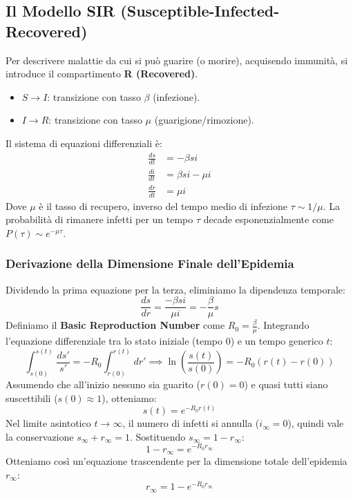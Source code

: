 \subsection{Il Modello SIR (Susceptible-Infected-Recovered)}
Per descrivere malattie da cui si può guarire (o morire), acquisendo immunità, si introduce il compartimento \textbf{R (Recovered)}.
\begin{itemize}
    \item $S \to I$: transizione con tasso $\beta$ (infezione).
    \item $I \to R$: transizione con tasso $\mu$ (guarigione/rimozione).
\end{itemize}
Il sistema di equazioni differenziali è:
\begin{align}
    \frac{ds}{dt} &= -\beta s i \\
    \frac{di}{dt} &= \beta s i - \mu i \\
    \frac{dr}{dt} &= \mu i
\end{align}
Dove $\mu$ è il tasso di recupero, inverso del tempo medio di infezione $\tau \sim 1/\mu$. La probabilità di rimanere infetti per un tempo $\tau$ decade esponenzialmente come $P(\tau) \sim e^{-\mu \tau}$.

\subsubsection{Derivazione della Dimensione Finale dell'Epidemia}
Dividendo la prima equazione per la terza, eliminiamo la dipendenza temporale:
\begin{equation}
    \frac{ds}{dr} = \frac{-\beta s i}{\mu i} = -\frac{\beta}{\mu} s
\end{equation}
Definiamo il \textbf{Basic Reproduction Number} come $R_0 = \frac{\beta}{\mu}$. Integrando l'equazione differenziale tra lo stato iniziale (tempo 0) e un tempo generico $t$:
\begin{equation}
    \int_{s(0)}^{s(t)} \frac{ds'}{s'} = -R_0 \int_{r(0)}^{r(t)} dr' \implies \ln\left(\frac{s(t)}{s(0)}\right) = -R_0 (r(t) - r(0))
\end{equation}
Assumendo che all'inizio nessuno sia guarito ($r(0)=0$) e quasi tutti siano suscettibili ($s(0) \approx 1$), otteniamo:
\begin{equation}
    s(t) = e^{-R_0 r(t)}
\end{equation}
Nel limite asintotico $t \to \infty$, il numero di infetti si annulla ($i_\infty = 0$), quindi vale la conservazione $s_\infty + r_\infty = 1$. Sostituendo $s_\infty = 1 - r_\infty$:
\begin{equation}
    1 - r_\infty = e^{-R_0 r_\infty}
\end{equation}
Otteniamo così un'equazione trascendente per la dimensione totale dell'epidemia $r_\infty$:
\begin{equation}
    r_\infty = 1 - e^{-R_0 r_\infty}
\end{equation}

